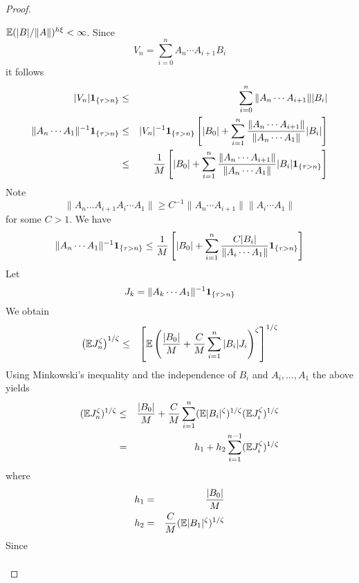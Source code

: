 \documentclass{article}
\theoremstyle{remark}
\begin{document}
\begin{proof}
\begin{enumerate}
    $\mathbb{E}(|B|/\|A\|)^{h\xi} <  \infty$. Since
    \[
    V_n = \sum_{i=0}^n A_n \cdots A_{i+1} B_i
    \]
    it follows
    \begin{eqnarray*}
      |V_n|\mathbf{1}_{\{\tau > n\}} &\leq&
      \sum_{i=0}^{n} \|A_n \cdots A_{i+1}\| |B_i| \\
      \|A_n \cdots A_1\|^{-1} \mathbf{1}_{\{\tau > n\}}
      &\leq& |V_n|^{-1} \mathbf{1}_{\{\tau > n\}}
      \left[
        |B_0| + \sum_{i=1}^n {
          \|A_n \cdots A_{i+1}\|
          \over
          \|A_n \cdots A_{1}\|
        } |B_i|
      \right] \\
      &\leq& {1 \over M}
      \left[
        |B_0| + \sum_{i=1}^n {
          \|A_n \cdots A_{i+1}\|
          \over
          \|A_n \cdots A_{1}\|
        } |B_i| \mathbf{1}_{\{\tau > n\}}
      \right]
    \end{eqnarray*}
    Note
    \[
    \|A_n \dots A_{i+1} A_i \cdots A_1\| \geq
    C^{-1} \|A_n \cdots A_{i+1}\|
    \|A_i \cdots A_{1}\|
    \]
    for some $C > 1$. We have
    \begin{equation}
      \label{eq:lower_bound}
      \|A_n \cdots A_1\|^{-1} \mathbf{1}_{\{\tau > n\}}
      \leq
      {1 \over M} \left[
        |B_0| + \sum_{i=1}^n {
          C |B_i|
          \over
          \|A_i \cdots A_1\|
        }  \mathbf{1}_{\{\tau > n\}}
      \right]
    \end{equation}
    Let
    \[
    J_k = \|A_k \cdots A_1\|^{-1} \mathbf{1}_{\{\tau > n\}}
    \]
    We obtain
    \begin{eqnarray*}
      \left(
        \mathbb{E} J_n^\zeta
      \right)^{1/\zeta} &\leq& \left[
        \mathbb{E} \left(
          {|B_0| \over M}
          + {C \over M} \sum_{i=1}^n |B_i| J_i
        \right)^\zeta
        \right]^{1/\zeta}
    \end{eqnarray*}
    Using Minkowski's inequality and the independence of $B_i$ and
    $A_i, \dots, A_1$ the above yields
    \begin{eqnarray}
      (\mathbb{E} J_n^\zeta)^{1/\zeta} &\leq&
      {|B_0| \over M} + {C \over M}
      \sum_{i=1}^n
      (\mathbb{E} |B_i|^\zeta)^{1/\zeta}
      (\mathbb{E} J_i^\zeta)^{1/\zeta}
      \label{eq:neg_pow_ub} \\
      &=& h_1 + h_2 \sum_{i=1}^{n-1} (\mathbb{E} J_i^\zeta)^{1/\zeta}
      \nonumber
    \end{eqnarray}
    where
    \begin{eqnarray*}
      h_1 &=& {|B_0| \over M} \\
      h_2 &=& {C \over M} (\mathbb{E} |B_1|^\zeta)^{1/\zeta}
    \end{eqnarray*}
    Since
    \begin{eqnarray*}

\end{eqnarray*}
\end{enumerate}
\end{proof}
\end{document}
